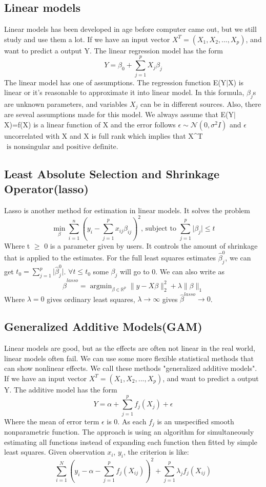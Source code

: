 \documentclass[11pt]{article}
\DeclareMathOperator*{\argminB}{argmin}   %
\begin{document}
\subsection{Linear models}  
Linear models has been developed in age before computer came out, but we still study and use them a lot. If we have an input vector $X^T=(X_1,X_2,...,X_p)$, and want to predict a output Y. The linear regression model has the form $$Y=\beta_0+\sum_{j=1}^{p} X_j\beta_j$$
The linear model has one of assumptions. The regression function E(Y$\mid$X) is linear or it's reasonable to approximate it into linear model. In this formula, $\beta_j$s are unknown parameters, and variables $X_j$ can be in different sources.  
Also, there are seveal assumptions made for this model. We always assume that E(Y$\mid$X)=f(X) is a linear function of X and the error follows $\epsilon \sim \mathcal N(0, \sigma^2I)$ and $\epsilon$ uncorrelated with X and X is full rank which implies that X^T $\text{ is nonsingular and positive definite.}$

\subsection{Least Absolute Selection and Shrinkage Operator(lasso)}  
Lasso is another method for estimation in linear models. It solves the problem $$\min_{\beta} \sum_{i=1}^{n} (y_i-\sum_{j=1}^{p} x_{ij}\beta_{ij})^2 \text{, subject to } \sum_{j=1}^{p} \lvert \beta_j \rvert \leq t$$
Where t $\geq$ 0 is a parameter given by users. It controls the amount of shrinkage that is applied to the estimates. For the full least squares estimates $\hat{\beta}^0_j$, we can get $t_0=\sum_{j=1}^{p} \lvert \hat{\beta}^0_j \rvert$. $\forall t \leq t_0$ some $\beta_j$ will go to 0. We can also write as $$\hat\beta^{lasso}=\argminB_{\beta \in \mathbb{R}^p} \lVert y-X\beta\rVert^2_2+\lambda\lVert \beta \rVert_1$$
Where $\lambda=0$ gives ordinary least squares, $\lambda\to\infty$ gives $\hat\beta^{lasso}\to0$. 

\subsection{Generalized Additive Models(GAM)}  
Linear models are good, but as the effects are often not linear in the real world, linear models often fail. We can use some more flexible statistical methods that can show nonlinear effects. We call these methods "generalized additive models". If we have an input vector $X^T=(X_1,X_2,...,X_p)$, and want to predict a output Y. The additive model has the form $$Y=\alpha+\sum_{j=1}^{p} f_j(X_j)+\epsilon$$
Where the mean of error term $\epsilon$ is 0. As each $f_j$ is an unspecified smooth nonparametric function. The approach is using an algorithm for simultaneously estimating all functions instead of expanding each function then fitted by simple least squares. Given observation $x_i$, $y_i$, the criterion is like: $$\sum_{i=1}^{N} (y_i-\alpha-\sum_{j=1}^{p}f_j(X_{ij}))^2+\sum_{j=1}^{p} \lambda_jf_j(X_{ij})$$
\end{document}
